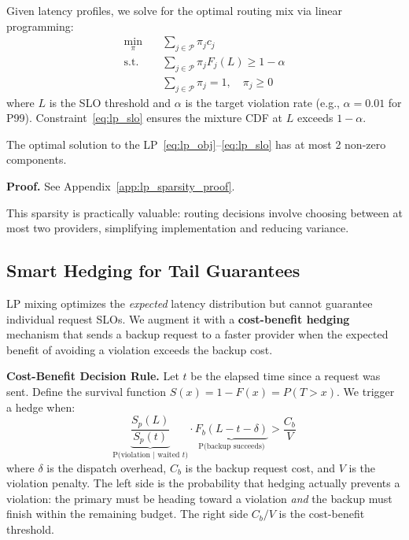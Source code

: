 Given latency profiles, we solve for the optimal routing mix via linear programming:
\begin{align}
\min_{\pi} \quad & \sum_{j \in \mathcal{P}} \pi_j c_j \label{eq:lp_obj} \\
\text{s.t.} \quad & \sum_{j \in \mathcal{P}} \pi_j F_j(L) \geq 1 - \alpha \label{eq:lp_slo} \\
& \sum_{j \in \mathcal{P}} \pi_j = 1, \quad \pi_j \geq 0 \nonumber
\end{align}
where $L$ is the SLO threshold and $\alpha$ is the target violation rate (e.g., $\alpha = 0.01$ for P99). Constraint~\eqref{eq:lp_slo} ensures the mixture CDF at $L$ exceeds $1 - \alpha$.

\begin{proposition}
\label{prop:lp_sparsity}
The optimal solution to the LP~\eqref{eq:lp_obj}--\eqref{eq:lp_slo} has at most 2 non-zero components.
\end{proposition}

\textbf{Proof.} See Appendix~\ref{app:lp_sparsity_proof}.

This sparsity is practically valuable: routing decisions involve choosing between at most two providers, simplifying implementation and reducing variance.

\subsection{Smart Hedging for Tail Guarantees}

LP mixing optimizes the \textit{expected} latency distribution but cannot guarantee individual request SLOs. We augment it with a \textbf{cost-benefit hedging} mechanism that sends a backup request to a faster provider when the expected benefit of avoiding a violation exceeds the backup cost.

\textbf{Cost-Benefit Decision Rule.}
Let $t$ be the elapsed time since a request was sent. Define the survival function $S(x) = 1 - F(x) = P(T > x)$. We trigger a hedge when:
\begin{equation}
    \underbrace{\frac{S_p(L)}{S_p(t)}}_{\text{P(violation | waited } t\text{)}} \cdot \underbrace{F_b(L - t - \delta)}_{\text{P(backup succeeds)}} > \frac{C_b}{V}
    \label{eq:hedge_economic}
\end{equation}
where $\delta$ is the dispatch overhead, $C_b$ is the backup request cost, and $V$ is the violation penalty. The left side is the probability that hedging actually prevents a violation: the primary must be heading toward a violation \textit{and} the backup must finish within the remaining budget. The right side $C_b / V$ is the cost-benefit threshold.

